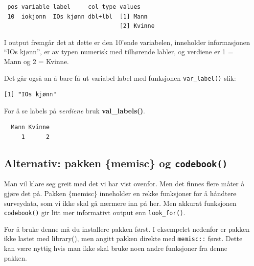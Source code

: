 \documentclass[
  letterpaper,
  DIV=11,
  numbers=noendperiod]{scrreprt}
\newenvironment{Shaded}{\begin{snugshade}}{\end{snugshade}}
\newcommand{\FunctionTok}[1]{\textcolor[rgb]{0.28,0.35,0.67}{#1}}
\newcommand{\NormalTok}[1]{\textcolor[rgb]{0.00,0.23,0.31}{#1}}
\newcommand{\SpecialCharTok}[1]{\textcolor[rgb]{0.37,0.37,0.37}{#1}}
\begin{document}
\begin{verbatim}
 pos variable label     col_type values    
 10  iokjonn  IOs kjønn dbl+lbl  [1] Mann  
                                 [2] Kvinne
\end{verbatim}

I output fremgår det at dette er den 10'ende variabelen, inneholder
informasjonen ``IOs kjønn'', er av typen numerisk med tilhørende labler,
og verdiene er 1 = Mann og 2 = Kvinne.

Det går også an å bare få ut variabel-label med funksjonen
\texttt{var\_label()} slik:

\begin{Shaded}
\end{Shaded}

\begin{verbatim}
[1] "IOs kjønn"
\end{verbatim}

For å se labels på \emph{verdiene} bruk \textbf{val\_labels()}.

\begin{Shaded}
\end{Shaded}

\begin{verbatim}
  Mann Kvinne 
     1      2 
\end{verbatim}

\hypertarget{alternativ-pakken-memisc-og-codebook}{%
\subsection{\texorpdfstring{Alternativ: pakken \{memisc\} og
\texttt{codebook()}}{Alternativ: pakken \{memisc\} og codebook()}}\label{alternativ-pakken-memisc-og-codebook}}

Man vil klare seg greit med det vi har vist ovenfor. Men det finnes
flere måter å gjøre det på. Pakken \{memisc\} inneholder en rekke
funksjoner for å håndtere surveydata, som vi ikke skal gå nærmere inn på
her. Men akkurat funksjonen \texttt{codebook()} gir litt mer informativt
output enn \texttt{look\_for()}.

For å bruke denne må du installere pakken først. I eksempelet nedenfor
er pakken ikke lastet med library(), men angitt pakken direkte med
\texttt{memisc::} først. Dette kan være nyttig hvis man ikke skal bruke
noen andre funksjoner fra denne pakken.
\end{document}
